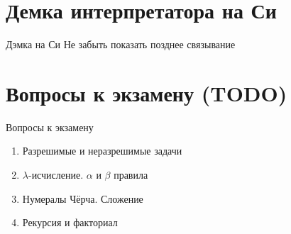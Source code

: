 \section{Демка интерпретатора на Си}
\begin{frame}{Дэмка на Си}
  Не забыть показать позднее связывание
\end{frame}

\section*{Вопросы к экзамену (TODO)}
\begin{frame}{Вопросы к экзамену}
\begin{enumerate}
  \item Разрешимые и неразрешимые задачи
  \item $\lambda$-исчисление. $\alpha$ и $\beta$ правила
  \item Нумералы Чёрча. Сложение
  \item Рекурсия и факториал
\end{enumerate}
\end{frame}


